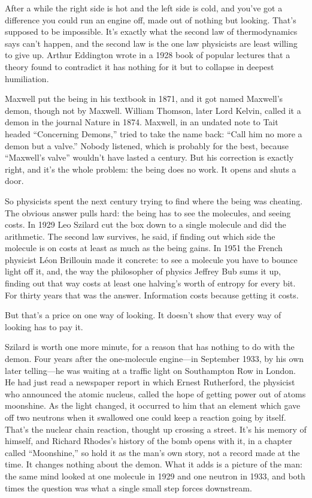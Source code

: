 \documentclass[11pt,twoside]{article}
\theoremstyle{thielethm}
\theoremstyle{thieledef}
\theoremstyle{thieledef}
\theoremstyle{thieledef}
\theoremstyle{thielethm}
\theoremstyle{thieleobs}
\theoremstyle{thielethm}
\begin{document}
After a while the right side is hot and the left side is cold, and you've got a difference you could run an engine off, made out of nothing but looking. That's supposed to be impossible. It's exactly what the second law of thermodynamics says can't happen, and the second law is the one law physicists are least willing to give up. Arthur Eddington wrote in a 1928 book of popular lectures that a theory found to contradict it has nothing for it but to collapse in deepest humiliation.

Maxwell put the being in his textbook in 1871, and it got named Maxwell's demon, though not by Maxwell. William Thomson, later Lord Kelvin, called it a demon in the journal Nature in 1874. Maxwell, in an undated note to Tait headed ``Concerning Demons,'' tried to take the name back: ``Call him no more a demon but a valve.'' Nobody listened, which is probably for the best, because ``Maxwell's valve'' wouldn't have lasted a century. But his correction is exactly right, and it's the whole problem: the being does no work. It opens and shuts a door.

So physicists spent the next century trying to find where the being was cheating. The obvious answer pulls hard: the being has to see the molecules, and seeing costs. In 1929 Leo Szilard cut the box down to a single molecule and did the arithmetic. The second law survives, he said, if finding out which side the molecule is on costs at least as much as the being gains. In 1951 the French physicist Léon Brillouin made it concrete: to see a molecule you have to bounce light off it, and, the way the philosopher of physics Jeffrey Bub sums it up, finding out that way costs at least one halving's worth of entropy for every bit. For thirty years that was the answer. Information costs because getting it costs.

But that's a price on one way of looking. It doesn't show that every way of looking has to pay it.

Szilard is worth one more minute, for a reason that has nothing to do with the demon. Four years after the one-molecule engine---in September 1933, by his own later telling---he was waiting at a traffic light on Southampton Row in London. He had just read a newspaper report in which Ernest Rutherford, the physicist who announced the atomic nucleus, called the hope of getting power out of atoms moonshine. As the light changed, it occurred to him that an element which gave off two neutrons when it swallowed one could keep a reaction going by itself. That's the nuclear chain reaction, thought up crossing a street. It's his memory of himself, and Richard Rhodes's history of the bomb opens with it, in a chapter called ``Moonshine,'' so hold it as the man's own story, not a record made at the time. It changes nothing about the demon. What it adds is a picture of the man: the same mind looked at one molecule in 1929 and one neutron in 1933, and both times the question was what a single small step forces downstream.
\end{document}
